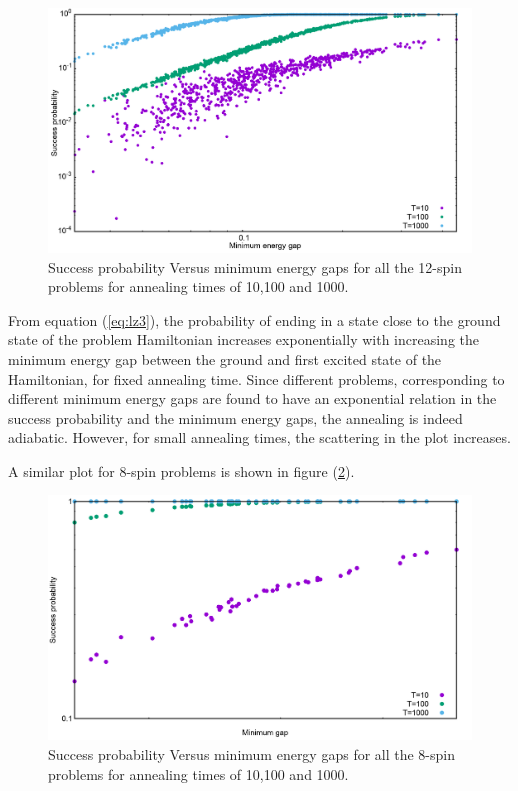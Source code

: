 \documentclass[../main.tex]{subfiles}
\begin{document}
\begin{figure}[H]
\centering 
\includegraphics[scale=0.3]{GapVsSucc_s12_T10_100_1000.png}
\caption{Success probability Versus minimum energy gaps for all the 12-spin problems for annealing times of 10,100 and 1000.}
\label{fig:o10}
\end{figure}
From equation (\ref{eq:lz3}), the probability of ending in a state close to the ground state of the problem Hamiltonian increases exponentially with increasing the minimum energy gap between the ground and first excited state of the Hamiltonian, for fixed annealing time. Since different problems, corresponding to different minimum energy gaps are found to have an exponential relation in the success probability and the minimum energy gaps, the annealing is indeed adiabatic. However, for small annealing times, the scattering in the plot increases. 

A similar plot for 8-spin problems is shown in figure (\ref{fig:o11}).
\begin{figure}[H]
\centering 
\includegraphics[scale=0.3]{GapVsSucc_s8_T10_100_1000.png}
\caption{Success probability Versus minimum energy gaps for all the 8-spin problems for annealing times of 10,100 and 1000.}
\label{fig:o11}
\end{figure}
\end{document}

